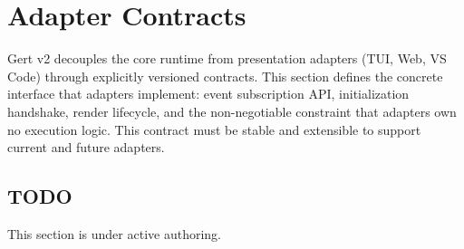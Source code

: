 \chapter{Adapter Contracts}

Gert v2 decouples the core runtime from presentation adapters (TUI, Web, VS Code) through explicitly versioned contracts. This section defines the concrete interface that adapters implement: event subscription API, initialization handshake, render lifecycle, and the non-negotiable constraint that adapters own no execution logic. This contract must be stable and extensible to support current and future adapters.

\section{TODO}

This section is under active authoring.
